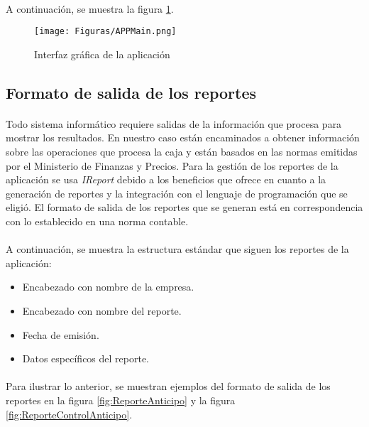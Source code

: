 \paragraph{}A continuación, se muestra la figura \ref{fig:AppMain}.

\begin{figure}[H] %
	\centering
	\texttt{[image: Figuras/APPMain.png]}
	\caption{Interfaz gráfica de la aplicación}
	\label{fig:AppMain}
\end{figure}

\subsection{Formato de salida de los reportes}
\paragraph{}Todo sistema informático requiere salidas de la información que procesa para mostrar los resultados. En nuestro caso están encaminados a obtener información sobre las operaciones que procesa la caja y están basados en las normas emitidas por el Ministerio de Finanzas y Precios. Para la gestión de los reportes de la aplicación se usa \textit{IReport} debido a los beneficios que ofrece en cuanto a la generación de reportes y la integración con el lenguaje de programación que se eligió. El formato de salida de los reportes que se generan está en correspondencia con lo establecido en una norma contable\cite{noauthor_resolucion_2007}.
\paragraph{}A continuación, se muestra la estructura estándar que siguen los reportes de la aplicación:
\begin{itemize}
	\item Encabezado con nombre de la empresa.
	\item Encabezado con nombre del reporte.
	\item Fecha de emisión.
	\item Datos específicos del reporte.
\end{itemize}

\paragraph{}Para ilustrar lo anterior, se muestran ejemplos del formato de salida de los reportes en la figura \ref{fig:ReporteAnticipo} y la figura \ref{fig:ReporteControlAnticipo}.

